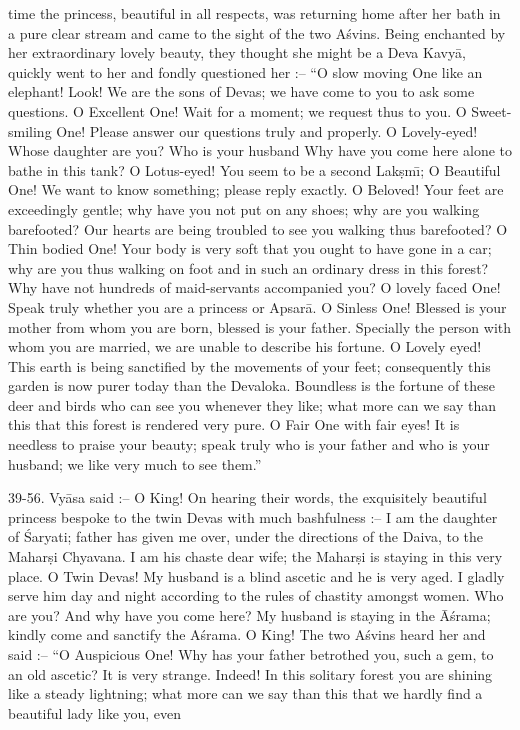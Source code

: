 time the princess, beautiful in all respects, was returning home after her bath in a pure clear stream and came to the sight of the two A\'svins. Being enchanted by her extraordinary lovely beauty, they thought she might be a Deva Kavy\=a, quickly went to her and fondly questioned her :-- ``O slow moving One like an elephant! Look! We are the sons of Devas; we have come to you to ask some questions. O Excellent One! Wait for a moment; we request thus to you. O Sweet-smiling One! Please answer our questions truly and properly. O Lovely-eyed! Whose daughter are you? Who is your husband Why have you come here alone to bathe in this tank? O Lotus-eyed! You seem to be a second Lak\d{s}m\={\i}; O Beautiful One! We want to know something; please reply exactly. O Beloved! Your feet are exceedingly gentle; why have you not put on any shoes; why are you walking barefooted? Our hearts are being troubled to see you walking thus barefooted? O Thin bodied One! Your body is very soft that you ought to have gone in a car; why are you thus walking on foot and in such an ordinary dress in this forest? Why have not hundreds of maid-servants accompanied you? O lovely faced One! Speak truly whether you are a princess or Apsar\=a. O Sinless One! Blessed is your mother from whom you are born, blessed is your father. Specially the person with whom you are married, we are unable to describe his fortune. O Lovely eyed! This earth is being sanctified by the movements of your feet; consequently this garden is now purer today than the Devaloka. Boundless is the fortune of these deer and birds who can see you whenever they like; what more can we say than this that this forest is rendered very pure. O Fair One with fair eyes! It is needless to praise your beauty; speak truly who is your father and who is your husband; we like very much to see them.''

39-56. Vy\=asa said :-- O King! On hearing their words, the exquisitely beautiful princess bespoke to the twin Devas with much bashfulness :-- I am the daughter of \'Saryati; father has given me over, under the directions of the Daiva, to the Mahar\d{s}i Chyavana. I am his chaste dear wife; the Mahar\d{s}i is staying in this very place. O Twin Devas! My husband is a blind ascetic and he is very aged. I gladly serve him day and night according to the rules of chastity amongst women. Who are you? And why have you come here? My husband is staying in the \=A\'srama; kindly come and sanctify the A\'srama. O King! The two A\'svins heard her and said :-- ``O Auspicious One! Why has your father betrothed you, such a gem, to an old ascetic? It is very strange. Indeed! In this solitary forest you are shining like a steady lightning; what more can we say than this that we hardly find a beautiful lady like you, even

